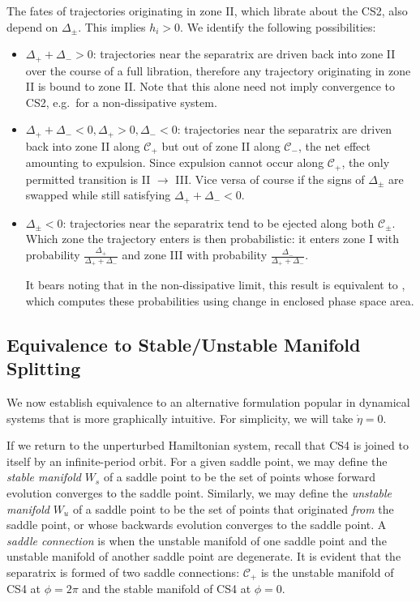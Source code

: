 \documentclass[
        fleqn,
        usenatbib,
    ]{mnras}
\begin{document}
The fates of trajectories originating in zone II, which librate about the
CS2, also depend on $\Delta_{\pm}$. This implies $h_i > 0$. We identify the
following possibilities:
\begin{itemize}
    \item $\Delta_{+} + \Delta_- > 0$: trajectories near the separatrix are
        driven back into zone II over the course of a full libration, therefore
        any trajectory originating in zone II is bound to zone II\@. Note that
        this alone need not imply convergence to CS2, e.g.\ for a
        non-dissipative system.

    \item $\Delta_+ + \Delta_- < 0, \Delta_+ > 0, \Delta_- < 0$: trajectories
        near the separatrix are driven back into zone II along $\mathcal{C}_+$
        but out of zone II along $\mathcal{C}_-$, the net effect amounting to
        expulsion. Since expulsion cannot occur along $\mathcal{C}_+$, the only
        permitted transition is II $\to$ III\@. Vice versa of course if the signs
        of $\Delta_{\pm}$ are swapped while still satisfying $\Delta_+ +
        \Delta_- < 0$.

    \item $\Delta_\pm < 0$: trajectories near the separatrix tend to be
        ejected along both $\mathcal{C}_{\pm}$. Which zone the trajectory enters
        is then probabilistic: it enters zone I with probability
        $\frac{\Delta_+}{\Delta_+ + \Delta_-}$ and zone III with probability
        $\frac{\Delta_-}{\Delta_+ + \Delta_-}$.

        It bears noting that in the non-dissipative limit, this result is
        equivalent to \citep{henrard1987}, which computes these probabilities
        using change in enclosed phase space area.
\end{itemize}

\subsection{Equivalence to Stable/Unstable Manifold Splitting}\label{ss:meln}

We now establish equivalence to an alternative formulation popular in dynamical
systems that is more graphically intuitive. For simplicity, we will take
$\dot{\eta} = 0$.

If we return to the unperturbed Hamiltonian system, recall that CS4 is joined to
itself by an infinite-period orbit. For a given saddle point, we may define the
\emph{stable manifold} $W_s$ of a saddle point to be the set of points whose
forward evolution converges to the saddle point. Similarly, we may define the
\emph{unstable manifold} $W_u$ of a saddle point to be the set of points that
originated \emph{from} the saddle point, or whose backwards evolution converges
to the saddle point. A \emph{saddle connection} is when the unstable manifold of
one saddle point and the unstable manifold of another saddle point are
degenerate. It is evident that the separatrix is formed of two saddle
connections: $\mathcal{C}_+$ is the unstable manifold of CS4 at $\phi = 2\pi$
and the stable manifold of CS4 at $\phi = 0$.
\end{document}
